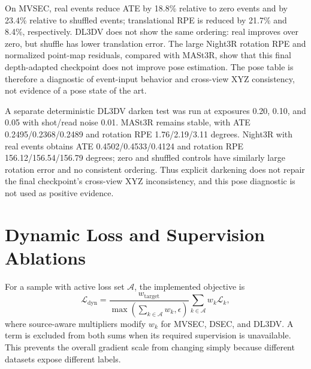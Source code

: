 \documentclass[10pt]{article}
\begin{document}
On MVSEC, real events reduce ATE by 18.8\% relative to zero events and by
23.4\% relative to shuffled events; translational RPE is reduced by 21.7\% and
8.4\%, respectively.  DL3DV does not show the same ordering: real improves over
zero, but shuffle has lower translation error.  The large Night3R rotation RPE
and normalized point-map residuals, compared with MASt3R, show that this final
depth-adapted checkpoint does not improve pose estimation.  The pose table is
therefore a diagnostic of event-input behavior and cross-view XYZ consistency,
not evidence of a pose state of the art.

A separate deterministic DL3DV darken test was run at exposures 0.20, 0.10,
and 0.05 with shot/read noise 0.01.  MASt3R remains stable, with ATE
0.2495/0.2368/0.2489 and rotation RPE 1.76/2.19/3.11 degrees.  Night3R with
real events obtains ATE 0.4502/0.4533/0.4124 and rotation RPE
156.12/156.54/156.79 degrees; zero and shuffled controls have similarly large
rotation error and no consistent ordering.  Thus explicit darkening does not
repair the final checkpoint's cross-view XYZ inconsistency, and this pose
diagnostic is not used as positive evidence.

\section{Dynamic Loss and Supervision Ablations}

For a sample with active loss set $\mathcal{A}$, the implemented objective is
\begin{equation}
  \mathcal{L}_{\mathrm{dyn}}
  = \frac{w_{\mathrm{target}}}
  {\max(\sum_{k\in\mathcal{A}} w_k,\epsilon)}
  \sum_{k\in\mathcal{A}} w_k\mathcal{L}_k,
\end{equation}
where source-aware multipliers modify $w_k$ for MVSEC, DSEC, and DL3DV.  A term
is excluded from both sums when its required supervision is unavailable.  This
prevents the overall gradient scale from changing simply because different
datasets expose different labels.
\end{document}
